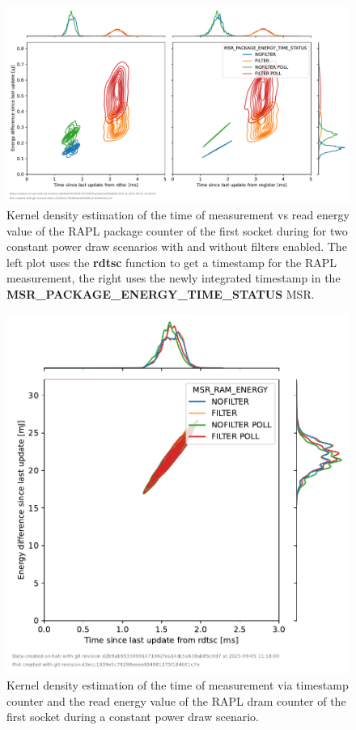 \begin{figure}[]
    \centering
    \includegraphics[width=\columnwidth]{fig/rapl-update-intervals/MSR_PACKAGE_ENERGY_TIME_STATUS_2000000.pdf}
    \caption{\label{fig:rapl-update-intervals-package}Kernel density estimation of the time of measurement vs read energy value of the RAPL package counter of the first socket during for two constant power draw scenarios with and without filters enabled.
    The left plot uses the \textbf{rdtsc} function to get a timestamp for the RAPL measurement, the right uses the newly integrated timestamp in the \textbf{MSR\_PACKAGE\_ENERGY\_TIME\_STATUS} MSR.}
\end{figure}

\begin{figure}[]
    \centering
    \includegraphics[width=0.54\columnwidth]{fig/rapl-update-intervals/MSR_RAM_ENERGY_2000000.pdf}
    \caption{\label{fig:rapl-update-intervals-dram}Kernel density estimation of the time of measurement via timestamp counter and the read energy value of the RAPL dram counter of the first socket during a constant power draw scenario.}
\end{figure}